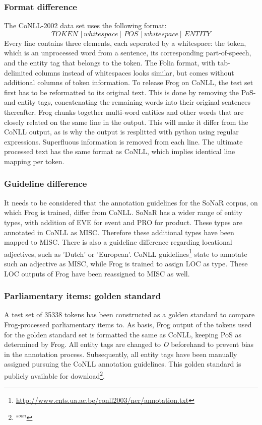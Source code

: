 \subsubsection{Format difference}
The CoNLL-2002 data set uses the following format: $$TOKEN\,[whitespace]\,POS\,[whitespace]\,ENTITY$$ Every line contains three elements, each seperated by a whitespace: the token, which is an unprocessed word from a sentence, its corresponding part-of-speech, and the entity tag that belongs to the token. The Folia format, with tab-delimited columns instead of whitespaces looks similar, but comes without additional columns of token information. To release Frog on CoNLL, the test set first has to be reformatted to its original text. This is done by removing the PoS- and entity tags, concatenating the remaining words into their original sentences thereafter.  Frog chunks together multi-word entities and other words that are closely related on the same line in the output. This will make it differ from the CoNLL output, as is why the output is resplitted with python using regular expressions. Superfluous information is removed from each line. The ultimate processed text has the same format as CoNLL, which implies identical line mapping per token.

\subsubsection{Guideline difference}
It needs to be considered that the annotation guidelines for the SoNaR corpus, on which Frog is trained, differ from CoNLL. SoNaR has a wider range of entity types, with addition of EVE for event and PRO for product. These types are annotated in CoNLL as MISC. Therefore these additional types have been mapped to MISC. There is also a guideline difference regarding locational adjectives, such as 'Dutch' or 'European'. CoNLL guidelines\footnote{\url{http://www.cnts.ua.ac.be/conll2003/ner/annotation.txt}} state to annotate such an adjective as MISC, while Frog is trained to assign LOC as type. These LOC outputs of Frog have been reassigned to MISC as well.

\subsubsection{Parliamentary items: golden standard}
A test set of 35338 tokens has been constructed as a golden standard to compare Frog-processed parliamentary items to. As basis, Frog output of the tokens used for the golden standard set is formatted the same as CoNLL, keeping PoS as determined by Frog. All entity tags are changed to \textit{O} beforehand to prevent bias in the annotation process. Subsequently, all entity tags have been manually assigned pursuing the CoNLL annotation guidelines. This golden standard is publicly available for download\footnote{$^{soon}$}. 

